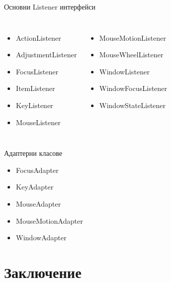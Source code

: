 \documentclass{beamer}
\begin{document}
\begin{frame}{Основни Listener интерфейси}
  \transdissolve
  \begin{columns}
    \begin{itemize}
      \item ActionListener
      \item AdjustmentListener
      \item FocusListener
      \item ItemListener
      \item KeyListener
      \item MouseListener
    \end{itemize}
    \begin{itemize}
      \item MouseMotionListener
      \item MouseWheelListener
      \item WindowListener
      \item WindowFocusListener
      \item WindowStateListener
    \end{itemize}

  \end{columns}
\end{frame}

\begin{frame}{Адаптерни класове}
  \transdissolve
  \begin{itemize}
  \item FocusAdapter
  \item KeyAdapter
  \item MouseAdapter
  \item MouseMotionAdapter
  \item WindowAdapter
  \end{itemize}
\end{frame}

\section*{Заключение}
\end{document}
